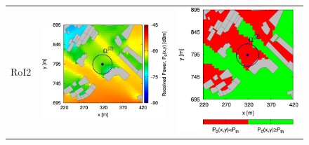 \begin{figure}[H]
\begin{center}
\begin{tabular}{ccc}
\begin{sideways}RoI2\end{sideways}&\includegraphics[scale=0.1]{./Figure/Planning.EM/RoI2/2/Fig.Received.Power.ZOOM.H-QoS-02.Reference.jpg}&\includegraphics[scale=0.1]{./Figure/Planning.EM/RoI2/2/Fig.Received.Power.ZOOM.RoI.Reference.Threshold.-65dBm.jpg}\tabularnewline

\end{tabular}
\end{center}
\end{figure}
